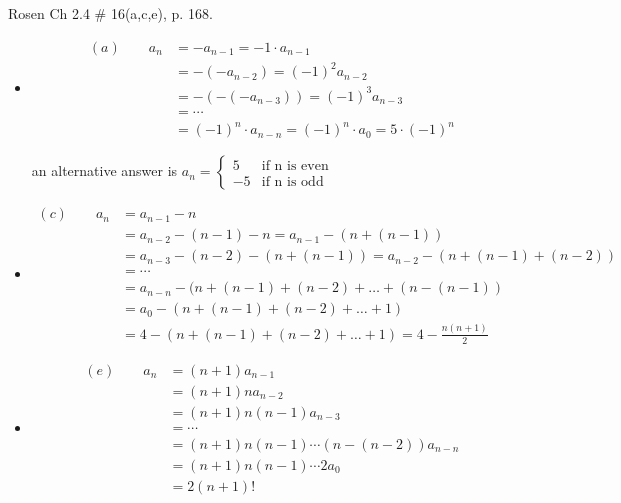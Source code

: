 \begin{questions}
 Rosen Ch 2.4 \# 16(a,c,e), p. 168.
    \ifprintanswers
        \vspace{-10pt}
   \fi
\begin{solution}
    \begin{itemize}[itemsep=0pt,parsep=0pt,topsep=0pt,partopsep=0pt]
        \item[]
        \small \vspace{-0.2in}
        \begin{align*}
            (a) \quad \quad a_n &= -a_{n-1} = -1\cdot a_{n-1} \\
              &= -(-a_{n-2}) = (-1)^2a_{n-2} \\
              &= -(-(-a_{n-3})) = (-1)^3a_{n-3} \\
              &= \cdots \\
              &= (-1)^n\cdot a_{n-n} = (-1)^n\cdot a_{0} = 5\cdot(-1)^n
        \end{align*}

        an alternative answer is 
        $ a_n = \begin{cases}
                  5 & \text{if n is even} \\
                  -5 & \text{if n is odd} 
                \end{cases} $
        \item[]
        \vspace{-0.1in} 
        \begin{align*}
            (c) \quad \quad a_n &= a_{n-1} - n \\
            &= a_{n-2} -(n-1) - n = a_{n-1} - (n + (n-1)) \\
            &= a_{n-3} -(n-2) - (n + (n-1)) = a_{n-2} - (n + (n-1) + (n-2)) \\
            &= \cdots \\
            &= a_{n-n} -(n + (n-1) + (n-2) + \ldots + (n- (n-1)) \\
            &= a_0 - (n + (n-1) + (n-2) + \ldots + 1) \\
            &= 4 - (n + (n-1) + (n-2) + \ldots + 1) = 4 -\frac{n(n+1)}{2}
        \end{align*}
        \vspace{-0.1in}
        \item[]
        \begin{align*}
            (e) \quad \quad a_n &= (n+1)a_{n-1} \\
              &= (n+1)na_{n-2} \\
              &= (n+1)n(n-1)a_{n-3} \\
              &= \cdots \\
              &= (n+1)n(n-1)\cdots(n-(n-2))a_{n-n} \\
              &= (n+1)n(n-1)\cdots2a_{0} \\
              &= 2(n+1)!
        \end{align*}
    \end{itemize}
\end{solution}




\end{questions}
